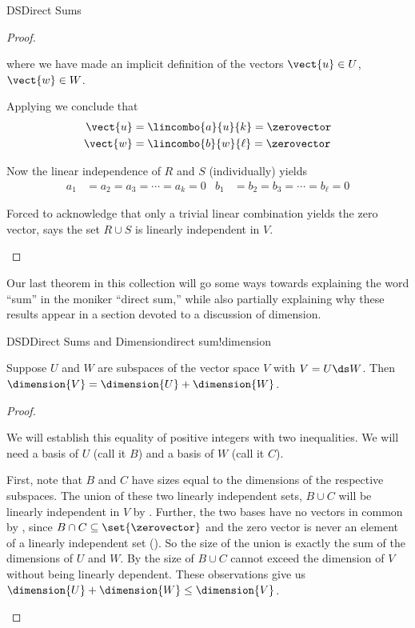 \begin{subsect}{DS}{Direct Sums}
\begin{proof}
\begin{para}
%
where we have made an implicit definition of the vectors $\vect{u}\in U$, $\vect{w}\in W$.\end{para}
%
\begin{para}Applying  we conclude that
%
\begin{align*}
\vect{u}&=\lincombo{a}{u}{k}=\zerovector\\
\vect{w}&=\lincombo{b}{w}{\ell}=\zerovector
\end{align*}
\end{para}
%
\begin{para}Now the linear independence of $R$ and $S$ (individually) yields
%
\begin{align*}
a_1&=a_2=a_3=\cdots=a_k=0
&
b_1&=b_2=b_3=\cdots=b_\ell=0
\end{align*}
\end{para}
%
\begin{para}Forced to acknowledge that only a trivial linear combination yields the zero vector,  says the set $R\cup S$ is linearly independent in $V$.\end{para}
%
\end{proof}
%
\begin{para}Our last theorem in this collection will go some ways towards explaining the word ``sum'' in the moniker ``direct sum,''  while also partially explaining why these results appear in a section devoted to a discussion of dimension.\end{para}
%
\begin{theorem}{DSD}{Direct Sums and Dimension}{direct sum!dimension}
\begin{para}Suppose $U$ and $W$ are subspaces of the vector space $V$ with $V=U\ds W$.  Then $\dimension{V}=\dimension{U}+\dimension{W}$.\end{para}
\end{theorem}
%
\begin{proof}
\begin{para}We will establish this equality of positive integers with two inequalities.  We will need a basis of $U$ (call it $B$) and a basis of $W$ (call it $C$).\end{para}
%
\begin{para}First,  note that $B$ and $C$ have sizes equal to the dimensions of the respective subspaces.  The union of these two linearly independent sets, $B\cup C$ will be linearly independent in $V$ by .  Further, the two bases have no vectors in common by , since $B\cap C\subseteq\set{\zerovector}$ and the zero vector is never an element of a linearly independent set ().  So the size of the union is exactly the sum of the dimensions of $U$ and $W$.  By  the size  of $B\cup C$ cannot exceed the dimension of $V$ without being linearly dependent.  These observations give us $\dimension{U}+\dimension{W}\leq\dimension{V}$.\end{para}

\end{proof}
\end{subsect}
